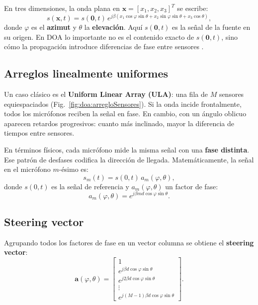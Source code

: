 En tres dimensiones, la onda plana en \(\mathbf{x} = [x_1,x_2,x_3]^T\) se escribe:
\begin{equation}
	s(\mathbf{x},t) = s(\mathbf{0},t)\, 
	e^{j \beta ( x_1 \cos\varphi \sin\theta + x_2 \sin\varphi \sin\theta + x_3 \cos\theta )},
\end{equation}
donde \(\varphi\) es el \textbf{azimut} y \(\theta\) la \textbf{elevación}.  
Aquí \(s(\mathbf{0},t)\) es la señal de la fuente en su origen.  
En DOA lo importante no es el contenido exacto de \(s(\mathbf{0},t)\), 
sino cómo la propagación introduce diferencias de fase entre sensores \cite{YangBook}.

\subsection{Arreglos linealmente uniformes}

Un caso clásico es el \textbf{Uniform Linear Array (ULA)}: 
una fila de $M$ sensores equiespaciados (Fig.~\ref{fig:doa:arregloSensores}).  
Si la onda incide frontalmente, todos los micrófonos reciben la señal en fase.  
En cambio, con un ángulo oblicuo aparecen retardos progresivos: 
cuanto más inclinado, mayor la diferencia de tiempos entre sensores.  

En términos físicos, cada micrófono mide la misma señal con una \textbf{fase distinta}.  
Ese patrón de desfases codifica la dirección de llegada.  
Matemáticamente, la señal en el micrófono $m$-ésimo es:
\begin{equation}
	s_m(t) = s(0,t)\, a_m(\varphi,\theta),
\end{equation}
donde $s(0,t)$ es la señal de referencia y $a_m(\varphi,\theta)$ un factor de fase:
\begin{equation}
	a_m(\varphi,\theta) = e^{j \beta m d \cos\varphi \sin\theta}.
\end{equation}

\subsection{Steering vector}

Agrupando todos los factores de fase en un vector columna se obtiene el \textbf{steering vector}:
\begin{equation}
	\mathbf{a}(\varphi,\theta) =
	\begin{bmatrix}
		1 \\
		e^{j \beta d \cos\varphi \sin\theta} \\
		e^{j 2 \beta d \cos\varphi \sin\theta} \\
		\vdots \\
		e^{j (M-1)\beta d \cos\varphi \sin\theta}
	\end{bmatrix}.
\end{equation}


